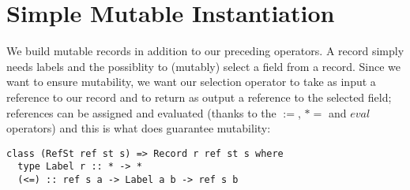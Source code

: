 \documentclass[a4paper]{article}
\begin{document}
\section{Simple Mutable Instantiation}
We build mutable records in addition to our preceding operators. A record simply needs labels and the possiblity to (mutably) select a
field from a record. Since we want to ensure mutability, we want our selection operator to take as input a reference to our record and
to return as output a reference to the selected field; references can be assigned and evaluated (thanks to the $:=$, $*=$ and $eval$
operators) and this is what does guarantee mutability:

\begin{verbatim}
class (RefSt ref st s) => Record r ref st s where
  type Label r :: * -> *
  (<=) :: ref s a -> Label a b -> ref s b
\end{verbatim}
\end{document}

